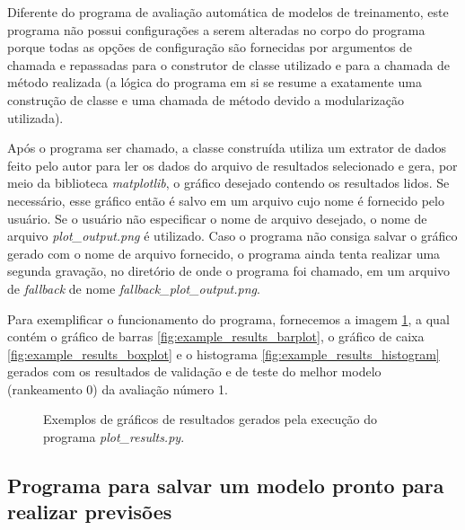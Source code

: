 Diferente do programa de avaliação automática de modelos de treinamento, este programa não possui configurações a serem alteradas no corpo do programa porque todas as opções de configuração são fornecidas por argumentos de chamada e repassadas para o construtor de classe utilizado e para a chamada de método realizada (a lógica do programa em si se resume a exatamente uma construção de classe e uma chamada de método devido a modularização utilizada).

Após o programa ser chamado, a classe construída utiliza um extrator de dados feito pelo autor para ler os dados do arquivo de resultados selecionado e gera, por meio da biblioteca \textit{matplotlib}, o gráfico desejado contendo os resultados lidos. Se necessário, esse gráfico então é salvo em um arquivo cujo nome é fornecido pelo usuário. Se o usuário não especificar o nome de arquivo desejado, o nome de arquivo \textit{plot\_output.png} é utilizado. Caso o programa não consiga salvar o gráfico gerado com o nome de arquivo fornecido, o programa ainda tenta realizar uma segunda gravação, no diretório de onde o programa foi chamado, em um arquivo de \textit{fallback} de nome \textit{fallback\_plot\_output.png}.

Para exemplificar o funcionamento do programa, fornecemos a imagem \ref{fig:example_results_plot}, a qual contém o gráfico de barras \ref{fig:example_results_barplot}, o gráfico de caixa \ref{fig:example_results_boxplot} e o histograma \ref{fig:example_results_histogram} gerados com os resultados de validação e de teste do melhor modelo (rankeamento 0) da avaliação número 1.

\begin{figure}[h]
	\centering
	\caption{Exemplos de gráficos de resultados gerados pela execução do programa \textit{plot\_results.py}.}
	\label{fig:example_results_plot}
\end{figure}

\subsection{Programa para salvar um modelo pronto para realizar previsões}

